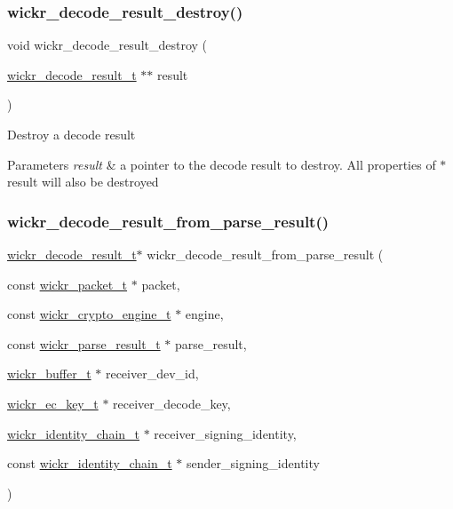 \subsubsection{\texorpdfstring{wickr\+\_\+decode\+\_\+result\+\_\+destroy()}{wickr\_decode\_result\_destroy()}}
{\footnotesize\ttfamily void wickr\+\_\+decode\+\_\+result\+\_\+destroy (\begin{DoxyParamCaption}\item[{\hyperlink{structwickr__decode__result}{wickr\+\_\+decode\+\_\+result\+\_\+t} $\ast$$\ast$}]{result }\end{DoxyParamCaption})}

Destroy a decode result


\begin{DoxyParams}{Parameters}
{\em result} & a pointer to the decode result to destroy. All properties of \textquotesingle{}$\ast$result\textquotesingle{} will also be destroyed \\
\hline
\end{DoxyParams}
\mbox{\label{group__wickr__protocol_ga32d9da2e10d1d653b2ac894d50aaedb0}} 
\subsubsection{\texorpdfstring{wickr\+\_\+decode\+\_\+result\+\_\+from\+\_\+parse\+\_\+result()}{wickr\_decode\_result\_from\_parse\_result()}}
{\footnotesize\ttfamily \hyperlink{structwickr__decode__result}{wickr\+\_\+decode\+\_\+result\+\_\+t}$\ast$ wickr\+\_\+decode\+\_\+result\+\_\+from\+\_\+parse\+\_\+result (\begin{DoxyParamCaption}\item[{const \hyperlink{structwickr__packet}{wickr\+\_\+packet\+\_\+t} $\ast$}]{packet,  }\item[{const \hyperlink{structwickr__crypto__engine}{wickr\+\_\+crypto\+\_\+engine\+\_\+t} $\ast$}]{engine,  }\item[{const \hyperlink{structwickr__parse__result}{wickr\+\_\+parse\+\_\+result\+\_\+t} $\ast$}]{parse\+\_\+result,  }\item[{\hyperlink{structwickr__buffer}{wickr\+\_\+buffer\+\_\+t} $\ast$}]{receiver\+\_\+dev\+\_\+id,  }\item[{\hyperlink{structwickr__ec__key}{wickr\+\_\+ec\+\_\+key\+\_\+t} $\ast$}]{receiver\+\_\+decode\+\_\+key,  }\item[{\hyperlink{structwickr__identity__chain}{wickr\+\_\+identity\+\_\+chain\+\_\+t} $\ast$}]{receiver\+\_\+signing\+\_\+identity,  }\item[{const \hyperlink{structwickr__identity__chain}{wickr\+\_\+identity\+\_\+chain\+\_\+t} $\ast$}]{sender\+\_\+signing\+\_\+identity }\end{DoxyParamCaption})}

